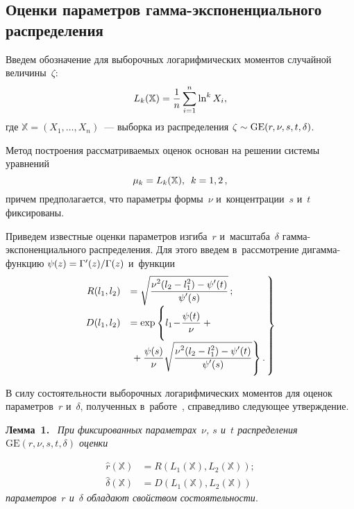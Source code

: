 \begin{multicols}{2}
\section{Оценки параметров гамма-экспоненциального распределения}

Введем обозначение для выборочных логарифмических моментов случайной величины~$\zeta$:
\begin{equation*}
\label{L_m}
L_k(\mathbb{X})=\displaystyle\frac{\displaystyle 1\mathstrut}{\displaystyle n\mathstrut}\sum\limits_{i=1}^n\ln^k X_i,
\end{equation*}
где $\mathbb{X}=(X_1,\ldots,X_n)$~--- выборка из рас\-пре\-де\-ле\-ния $\zeta\hm\sim \mathrm{GE}(r,\nu,s,t,\delta)$.

Метод построения рас\-смат\-ри\-ва\-емых оценок основан на решении сис\-те\-мы урав\-нений
$$
\mu_k=L_k(\mathbb{X}),\enskip k=1,2\,,
$$
причем предполагается, что па\-ра\-мет\-ры фор\-мы~$\nu$ и~кон\-цент\-ра\-ции~$s$ и~$t$ 
фик\-си\-ро\-ваны.

Приведем известные оценки па\-ра\-мет\-ров из\-ги\-ба~$r$ и~мас\-шта\-ба~$\delta$ гам\-ма-экс\-по\-нен\-ци\-аль\-но\-го 
рас\-пре\-де\-ле\-ния. Для этого введем в~рас\-смот\-ре\-ние ди\-гам\-ма-функ\-цию 
$ \psi(z)\hm={\Gamma'(z)}/{\Gamma(z)}$ и~функции
\begin{equation}
\left.
\begin{array}{rl}
\!\!\!\!R(l_1,l_2)&=
\sqrt{\fr{\nu^2(l_2-l_1^2)-{\psi'(t)}}{\psi'(s)}}\,;
\\[6pt]
\!\!\!\!D(l_1,l_2)&=
\exp\left\{
\vphantom{\sqrt{\fr{\nu^2(l_2\!-\!l_1^2)\!-\!{\psi'(t)}}{\psi'(s)}}^2}
l_1\!-\!
\fr{\psi(t)}{\nu}+{}\right.\\[6pt]
&\left.{}+\fr{\psi(s)}{\nu}\sqrt{\fr{\nu^2(l_2-l_1^2)-{\psi'(t)}}{\psi'(s)}}
\right\}.
\end{array}\!\!
\right\}\!
\label{R_D}
\end{equation}

В силу состоятельности выборочных логарифмических моментов для оценок па\-ра\-мет\-ров~$r$ и~$\delta$, 
полученных в~работе~\cite{KuShe2020}, справедливо сле\-ду\-ющее 
утверж\-де\-ние.

\smallskip

\noindent
\textbf{Лемма~1.}\
\textit{При фиксированных па\-ра\-мет\-рах~$\nu$, $s$ и~$t$ рас\-пре\-де\-ле\-ния 
$\mathrm{GE}(r,\nu,s,t,\delta)$ оценки}

\pagebreak

\noindent
\begin{align}
{\hat r}(\mathbb{X}) &=R(L_1(\mathbb{X}),L_2(\mathbb{X}));
\label{hat_r}\\
{\hat \delta}(\mathbb{X})&=D(L_1(\mathbb{X}),L_2(\mathbb{X}))
\label{hat_delta_r}
\end{align}
\textit{параметров~$r$ и~$\delta$ обладают свойством со\-сто\-я\-тель\-ности}.




\end{multicols}
